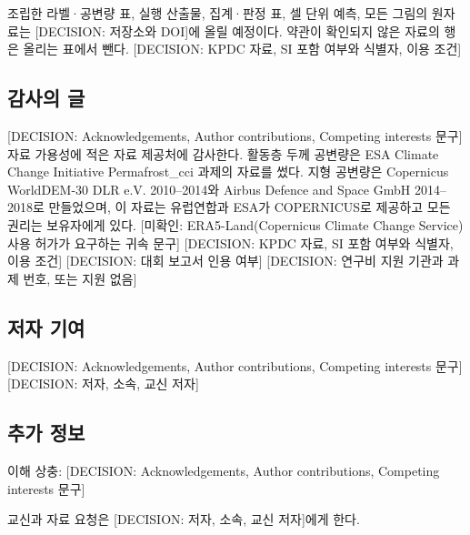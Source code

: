 조립한 라벨·공변량 표, 실행 산출물, 집계·판정 표, 셀 단위 예측, 모든 그림의 원자료는 [DECISION: 저장소와 DOI]에 올릴 예정이다. 약관이 확인되지 않은 자료의 행은 올리는 표에서 뺀다. [DECISION: KPDC 자료, SI 포함 여부와 식별자, 이용 조건]
\fi

\ifnum{}\relax
\subsection*{감사의 글}

[DECISION: Acknowledgements, Author contributions, Competing interests 문구] 자료 가용성에 적은 자료 제공처에 감사한다. 활동층 두께 공변량은 ESA Climate Change Initiative Permafrost\_cci 과제의 자료를 썼다. 지형 공변량은 Copernicus WorldDEM-30 \textcopyright{} DLR e.V. 2010--2014와 \textcopyright{} Airbus Defence and Space GmbH 2014--2018로 만들었으며, 이 자료는 유럽연합과 ESA가 COPERNICUS로 제공하고 모든 권리는 보유자에게 있다. [미확인: ERA5-Land(Copernicus Climate Change Service) 사용 허가가 요구하는 귀속 문구] [DECISION: KPDC 자료, SI 포함 여부와 식별자, 이용 조건] [DECISION: 대회 보고서 인용 여부] [DECISION: 연구비 지원 기관과 과제 번호, 또는 지원 없음]

\subsection*{저자 기여}

[DECISION: Acknowledgements, Author contributions, Competing interests 문구] [DECISION: 저자, 소속, 교신 저자]

\subsection*{추가 정보}

이해 상충: [DECISION: Acknowledgements, Author contributions, Competing interests 문구]

교신과 자료 요청은 [DECISION: 저자, 소속, 교신 저자]에게 한다.
\fi
